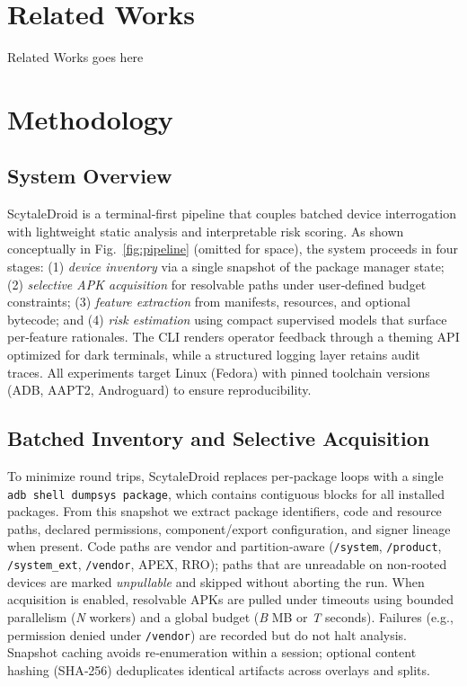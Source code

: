 \documentclass[10pt,conference]{IEEEtran}
\begin{document}
\section{Related Works}\label{sec:relatedwork}
Related Works goes here

\section{Methodology}\label{sec:method}
\subsection{System Overview}
ScytaleDroid is a terminal‐first pipeline that couples batched device interrogation with lightweight static analysis and interpretable risk scoring. As shown conceptually in Fig.~\ref{fig:pipeline} (omitted for space), the system proceeds in four stages: (1) \emph{device inventory} via a single snapshot of the package manager state; (2) \emph{selective APK acquisition} for resolvable paths under user‐defined budget constraints; (3) \emph{feature extraction} from manifests, resources, and optional bytecode; and (4) \emph{risk estimation} using compact supervised models that surface per‐feature rationales. The CLI renders operator feedback through a theming API optimized for dark terminals, while a structured logging layer retains audit traces. All experiments target Linux (Fedora) with pinned toolchain versions (ADB, AAPT2, Androguard) to ensure reproducibility.

\subsection{Batched Inventory and Selective Acquisition}
To minimize round trips, ScytaleDroid replaces per‐package loops with a single \texttt{adb shell dumpsys package}, which contains contiguous blocks for all installed packages. From this snapshot we extract package identifiers, code and resource paths, declared permissions, component/export configuration, and signer lineage when present. Code paths are vendor and partition‐aware (\texttt{/system}, \texttt{/product}, \texttt{/system\_ext}, \texttt{/vendor}, APEX, RRO); paths that are unreadable on non‐rooted devices are marked \emph{unpullable} and skipped without aborting the run. When acquisition is enabled, resolvable APKs are pulled under timeouts using bounded parallelism (\textit{N} workers) and a global budget (\textit{B} MB or \textit{T} seconds). Failures (e.g., permission denied under \texttt{/vendor}) are recorded but do not halt analysis. Snapshot caching avoids re‐enumeration within a session; optional content hashing (SHA‐256) deduplicates identical artifacts across overlays and splits.
\end{document}
